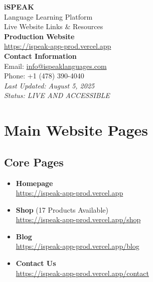 \documentclass[11pt,a4paper]{article}
\begin{document}
\begin{center}
    \vspace*{2cm}
    {\Huge \textcolor{ispeak-blue}{\textbf{iSPEAK}}}\\[0.5cm]
    {\LARGE \textcolor{ispeak-purple}{Language Learning Platform}}\\[1cm]
    {\Large Live Website Links \& Resources}\\[2cm]
    
    \Large
    \textbf{Production Website}\\[0.3cm]
    \href{https://ispeak-app-prod.vercel.app}{\Large\textcolor{link-blue}{https://ispeak-app-prod.vercel.app}}\\[3cm]
    
    \normalsize
    \textbf{Contact Information}\\[0.3cm]
    Email: \href{mailto:info@ispeaklanguages.com}{info@ispeaklanguages.com}\\
    Phone: +1 (478) 390-4040\\[2cm]
    
    \textit{Last Updated: August 5, 2025}\\
    \textit{Status: LIVE AND ACCESSIBLE}
\end{center}

\newpage

\tableofcontents
\newpage

\section{Main Website Pages}

\subsection{Core Pages}
\begin{itemize}[itemsep=0.5em]
    \item \textbf{Homepage}\\
    \href{https://ispeak-app-prod.vercel.app}{https://ispeak-app-prod.vercel.app}
    
    \item \textbf{Shop} (17 Products Available)\\
    \href{https://ispeak-app-prod.vercel.app/shop}{https://ispeak-app-prod.vercel.app/shop}
    
    \item \textbf{Blog}\\
    \href{https://ispeak-app-prod.vercel.app/blog}{https://ispeak-app-prod.vercel.app/blog}
    
    \item \textbf{Contact Us}\\
    \href{https://ispeak-app-prod.vercel.app/contact}{https://ispeak-app-prod.vercel.app/contact}
\end{itemize}
\end{document}
